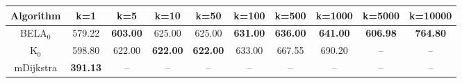 \begin{tabular}{c|ccccccccc}\toprule
Algorithm & k=1 & k=5 & k=10 & k=50 & k=100 & k=500 & k=1000 & k=5000 & k=10000 \\ \midrule
BELA$_0$ & 579.22 & \textbf{603.00} & 625.00 & 625.00 & \textbf{631.00} & \textbf{636.00} & \textbf{641.00} & \textbf{606.98} & \textbf{764.80} \\
K$_0$ & 598.80 & 622.00 & \textbf{622.00} & \textbf{622.00} & 633.00 & 667.55 & 690.20 & -- & -- \\
mDijkstra & \textbf{391.13} & -- & -- & -- & -- & -- & -- & -- & -- \\ \bottomrule 
\end{tabular}
